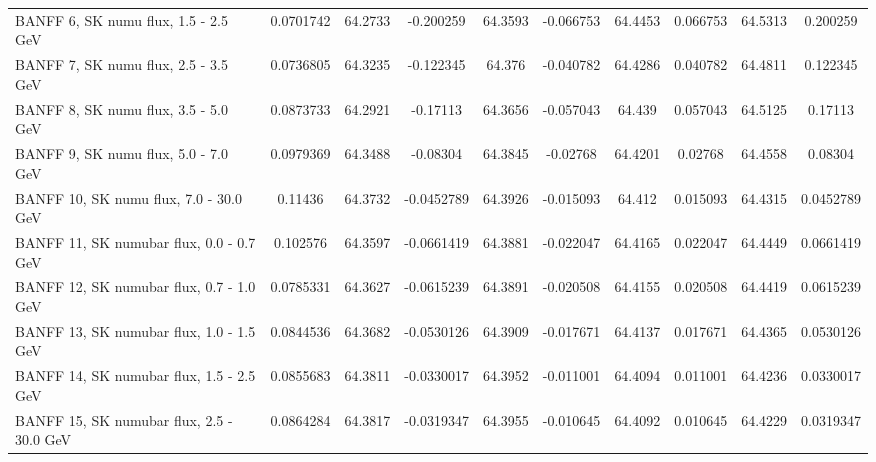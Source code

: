 \begin{tabular}{| l | S | S  S | S  S | S  S | S  S | }
                                           BANFF  6, SK numu flux, 1.5 - 2.5 GeV &       0.0701742 &         64.2733 &       -0.200259 &         64.3593 &       -0.066753 &         64.4453 &        0.066753 &         64.5313 &        0.200259 \\ 
                                           BANFF  7, SK numu flux, 2.5 - 3.5 GeV &       0.0736805 &         64.3235 &       -0.122345 &          64.376 &       -0.040782 &         64.4286 &        0.040782 &         64.4811 &        0.122345 \\ 
                                           BANFF  8, SK numu flux, 3.5 - 5.0 GeV &       0.0873733 &         64.2921 &        -0.17113 &         64.3656 &       -0.057043 &          64.439 &        0.057043 &         64.5125 &         0.17113 \\ 
                                           BANFF  9, SK numu flux, 5.0 - 7.0 GeV &       0.0979369 &         64.3488 &        -0.08304 &         64.3845 &        -0.02768 &         64.4201 &         0.02768 &         64.4558 &         0.08304 \\ 
                                          BANFF 10, SK numu flux, 7.0 - 30.0 GeV &         0.11436 &         64.3732 &      -0.0452789 &         64.3926 &       -0.015093 &          64.412 &        0.015093 &         64.4315 &       0.0452789 \\ 
                                        BANFF 11, SK numubar flux, 0.0 - 0.7 GeV &        0.102576 &         64.3597 &      -0.0661419 &         64.3881 &       -0.022047 &         64.4165 &        0.022047 &         64.4449 &       0.0661419 \\ 
                                        BANFF 12, SK numubar flux, 0.7 - 1.0 GeV &       0.0785331 &         64.3627 &      -0.0615239 &         64.3891 &       -0.020508 &         64.4155 &        0.020508 &         64.4419 &       0.0615239 \\ 
                                        BANFF 13, SK numubar flux, 1.0 - 1.5 GeV &       0.0844536 &         64.3682 &      -0.0530126 &         64.3909 &       -0.017671 &         64.4137 &        0.017671 &         64.4365 &       0.0530126 \\ 
                                        BANFF 14, SK numubar flux, 1.5 - 2.5 GeV &       0.0855683 &         64.3811 &      -0.0330017 &         64.3952 &       -0.011001 &         64.4094 &        0.011001 &         64.4236 &       0.0330017 \\ 
                                       BANFF 15, SK numubar flux, 2.5 - 30.0 GeV &       0.0864284 &         64.3817 &      -0.0319347 &         64.3955 &       -0.010645 &         64.4092 &        0.010645 &         64.4229 &       0.0319347 \\ 

\end{tabular}
